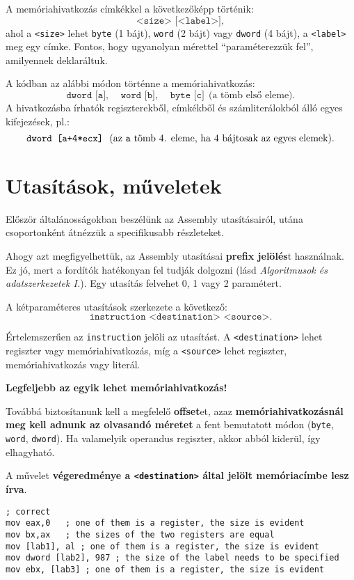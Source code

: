 A memóriahivatkozás címkékkel a következőképp történik:
\[ \texttt{<size> [<label>]}, \] ahol a \texttt{<size>} lehet \texttt{byte} (1 bájt), \texttt{word} (2 bájt) vagy \texttt{dword} (4 bájt), a \texttt{<label>} meg egy címke. Fontos, hogy ugyanolyan mérettel ``paraméterezzük fel'', amilyennek deklaráltuk.

A kódban az alábbi módon történne a memóriahivatkozás:
\[ \texttt{dword [a]}, ~~~~~ \texttt{word [b]}, ~~~~~ \texttt{byte [c]} ~~ \text{(a tömb első eleme)}. \]
A hivatkozásba írhatók regiszterekből, címkékből és számliterálokból álló egyes kifejezések, pl.:
\[ \texttt{dword [a+4*ecx]} ~~ \text{(az \texttt{a} tömb 4. eleme, ha 4 bájtosak az egyes elemek)}. \]

\pagebreak

\section{Utasítások, műveletek}

Először általánosságokban beszélünk az Assembly utasításairól, utána csoportonként átnézzük a specifikusabb részleteket.

Ahogy azt megfigyelhettük, az Assembly utasításai \textbf{prefix jelölés}t használnak. Ez jó, mert a fordítók hatékonyan fel tudják dolgozni (lásd \textit{Algoritmusok és adatszerkezetek I.}). Egy utasítás felvehet 0, 1 vagy 2 paramétert.

A kétparaméteres utasítások szerkezete a következő:
\[ \texttt{instruction <destination> <source>}. \]

Értelemszerűen az \texttt{instruction} jelöli az utasítást. A \texttt{<destination>} lehet regiszter vagy memóriahivatkozás, míg a \texttt{<source>} lehet regiszter, memóriahivatkozás vagy literál. 

\textbf{Legfeljebb az egyik lehet memóriahivatkozás!}

Továbbá biztosítanunk kell a megfelelő \textbf{offset}et, azaz \textbf{memóriahivatkozásnál meg kell adnunk az olvasandó méretet }a fent bemutatott módon (\texttt{byte}, \texttt{word}, \texttt{dword}). Ha valamelyik operandus regiszter, akkor abból kiderül, így elhagyható.

A művelet \textbf{végeredménye a \texttt{<destination>} által jelölt memóriacímbe lesz írva}.

\begin{lstlisting}[style=asmstyle, caption={Helyes paraméterezés}]
; correct
mov eax,0   ; one of them is a register, the size is evident
mov bx,ax   ; the sizes of the two registers are equal
mov [lab1], al ; one of them is a register, the size is evident
mov dword [lab2], 987 ; the size of the label needs to be specified
mov ebx, [lab3] ; one of them is a register, the size is evident
\end{lstlisting}


